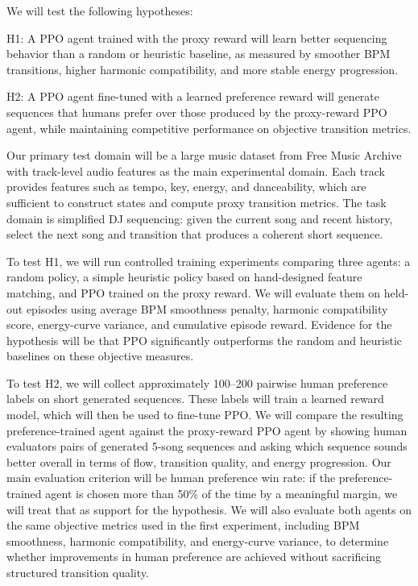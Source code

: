\documentclass{article}
\begin{document}
We will test the following hypotheses:

H1: A PPO agent trained with the proxy reward will learn better sequencing behavior than a random or heuristic baseline, as measured by smoother BPM transitions, higher harmonic compatibility, and more stable energy progression.

H2: A PPO agent fine-tuned with a learned preference reward will generate sequences that humans prefer over those produced by the proxy-reward PPO agent, while maintaining competitive performance on objective transition metrics.

Our primary test domain will be a large music dataset from Free Music Archive with track-level audio features as the main experimental domain. Each track provides features such as tempo, key, energy, and danceability, which are sufficient to construct states and compute proxy transition metrics. The task domain is simplified DJ sequencing: given the current song and recent history, select the next song and transition that produces a coherent short sequence.

To test H1, we will run controlled training experiments comparing three agents: a random policy, a simple heuristic policy based on hand-designed feature matching, and PPO trained on the proxy reward. We will evaluate them on held-out episodes using average BPM smoothness penalty, harmonic compatibility score, energy-curve variance, and cumulative episode reward. Evidence for the hypothesis will be that PPO significantly outperforms the random and heuristic baselines on these objective measures.

To test H2, we will collect approximately 100--200 pairwise human preference labels on short generated sequences. These labels will train a learned reward model, which will then be used to fine-tune PPO. We will compare the resulting preference-trained agent against the proxy-reward PPO agent by showing human evaluators pairs of generated 5-song sequences and asking which sequence sounds better overall in terms of flow, transition quality, and energy progression. Our main evaluation criterion will be human preference win rate: if the preference-trained agent is chosen more than 50\% of the time by a meaningful margin, we will treat that as support for the hypothesis. We will also evaluate both agents on the same objective metrics used in the first experiment, including BPM smoothness, harmonic compatibility, and energy-curve variance, to determine whether improvements in human preference are achieved without sacrificing structured transition quality.
\end{document}
